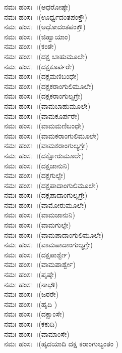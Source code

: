  ನಮಃ ಹಂಸಃ~।(ಅಧರೋಷ್ಠೇ)\\
 ನಮಃ ಹಂಸಃ~।(ಊರ್ಧ್ವದಂತಪಂಕ್ತೌ)\\
 ನಮಃ ಹಂಸಃ~।(ಅಧೋದಂತಪಂಕ್ತೌ)\\
 ನಮಃ ಹಂಸಃ~।(ಜಿಹ್ವಾಯಾಂ)\\
 ನಮಃ ಹಂಸಃ~।(ಕಂಠೇ)\\
 ನಮಃ ಹಂಸಃ~।(ದಕ್ಷ ಬಾಹುಮೂಲೇ)\\
 ನಮಃ ಹಂಸಃ~।(ದಕ್ಷಕೂರ್ಪರೇ)\\
 ನಮಃ ಹಂಸಃ~।(ದಕ್ಷಮಣಿಬಂಧೇ)\\
 ನಮಃ ಹಂಸಃ~।(ದಕ್ಷಕರಾಂಗುಲಿಮೂಲೇ)\\
 ನಮಃ ಹಂಸಃ~।(ದಕ್ಷಕರಾಂಗುಲ್ಯಗ್ರೇ)\\
 ನಮಃ ಹಂಸಃ~।(ವಾಮಬಾಹುಮೂಲೇ)\\
 ನಮಃ ಹಂಸಃ~।(ವಾಮಕೂರ್ಪರೇ)\\
 ನಮಃ ಹಂಸಃ~।(ವಾಮಮಣಿಬಂಧೇ)\\
 ನಮಃ ಹಂಸಃ~।(ವಾಮಕರಾಂಗುಲಿಮೂಲೇ)\\
 ನಮಃ ಹಂಸಃ~।(ವಾಮಕರಾಂಗುಲ್ಯಗ್ರೇ)\\
 ನಮಃ ಹಂಸಃ~।(ದಕ್ಷೋರುಮೂಲೇ)\\
 ನಮಃ ಹಂಸಃ~।(ದಕ್ಷಜಾನುನಿ)\\
 ನಮಃ ಹಂಸಃ~।(ದಕ್ಷಗುಲ್ಫೇ)\\
 ನಮಃ ಹಂಸಃ~।(ದಕ್ಷಪಾದಾಂಗುಲಿಮೂಲೇ)\\
 ನಮಃ ಹಂಸಃ~।(ದಕ್ಷಪಾದಾಂಗುಲ್ಯಗ್ರೇ)\\
 ನಮಃ ಹಂಸಃ~।(ವಾಮೋರುಮೂಲೇ)\\
 ನಮಃ ಹಂಸಃ~।(ವಾಮಜಾನುನಿ)\\
 ನಮಃ ಹಂಸಃ~।(ವಾಮಗುಲ್ಫೇ)\\
 ನಮಃ ಹಂಸಃ~।(ವಾಮಪಾದಾಂಗುಲಿಮೂಲೇ)\\
 ನಮಃ ಹಂಸಃ~।(ವಾಮಪಾದಾಂಗುಲ್ಯಗ್ರೇ)\\
 ನಮಃ ಹಂಸಃ~।(ದಕ್ಷಪಾರ್ಶ್ವೇ)\\
 ನಮಃ ಹಂಸಃ~।(ವಾಮಪಾರ್ಶ್ವೇ)\\
 ನಮಃ ಹಂಸಃ~।(ಪೃಷ್ಠೇ)\\
 ನಮಃ ಹಂಸಃ~।(ನಾಭೌ)\\
 ನಮಃ ಹಂಸಃ~।(ಜಠರೇ)\\
 ನಮಃ ಹಂಸಃ~।(ಹೃದಿ )\\
 ನಮಃ ಹಂಸಃ~।(ದಕ್ಷಾಂಸೇ)\\
 ನಮಃ ಹಂಸಃ~।(ಕಕುದಿ)\\
 ನಮಃ ಹಂಸಃ~।(ವಾಮಾಂಸೇ)\\
 ನಮಃ ಹಂಸಃ~।(ಹೃದಯಾದಿ ದಕ್ಷ ಕರಾಂಗುಲ್ಯಂತಂ )\\
